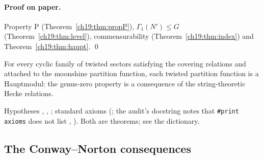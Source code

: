 \paragraph{Proof on paper.}  Property P (Theorem~\ref{ch19:thm:propP}), $\Gamma_1(N')\le G$ (Theorem~\ref{ch19:thm:level}), commensurability
(Theorem~\ref{ch19:thm:index}) and Theorem~\ref{ch19:thm:haupt}. \qed
\begin{physics}For every cyclic family of twisted sectors satisfying the covering relations and attached to the moonshine partition
function, each twisted partition function is a Hauptmodul: the genus-zero property is a consequence of the string-theoretic Hecke
relations.\end{physics}
\begin{status}Hypotheses , , ; standard axioms (; the audit's
docstring notes that \texttt{\#print axioms} does not list , ).  Both are theorems; see the dictionary.\end{status}

\subsection{The Conway--Norton consequences}

